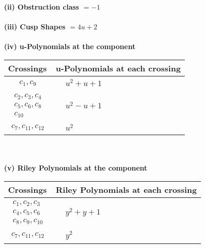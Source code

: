 \documentclass[1p]{elsarticle_modified}
\theoremstyle{definition}
\begin{document}
\flushleft \textbf{(ii) Obstruction class $= -1$}\\~\\
\flushleft \textbf{(iii) Cusp Shapes $= 4 u+2$}\\~\\
\newpage\renewcommand{\arraystretch}{1}
\flushleft \textbf{(iv) u-Polynomials at the component}\newline \\
\begin{tabular}{m{50pt}|m{274pt}}
Crossings & \hspace{64pt}u-Polynomials at each crossing \\
\hline $$\begin{aligned}c_{1},c_{9}\end{aligned}$$&$\begin{aligned}
&u^2+u+1
\end{aligned}$\\
\hline $$\begin{aligned}c_{2},c_{3},c_{4}\\c_{5},c_{6},c_{8}\\c_{10}\end{aligned}$$&$\begin{aligned}
&u^2- u+1
\end{aligned}$\\
\hline $$\begin{aligned}c_{7},c_{11},c_{12}\end{aligned}$$&$\begin{aligned}
&u^2
\end{aligned}$\\
\hline
\end{tabular}\\~\\
\newpage\renewcommand{\arraystretch}{1}
\flushleft \textbf{(v) Riley Polynomials at the component}\newline \\
\begin{tabular}{m{50pt}|m{274pt}}
Crossings & \hspace{64pt}Riley Polynomials at each crossing \\
\hline $$\begin{aligned}c_{1},c_{2},c_{3}\\c_{4},c_{5},c_{6}\\c_{8},c_{9},c_{10}\end{aligned}$$&$\begin{aligned}
&y^2+y+1
\end{aligned}$\\
\hline $$\begin{aligned}c_{7},c_{11},c_{12}\end{aligned}$$&$\begin{aligned}
&y^2
\end{aligned}$\\
\hline
\end{tabular}\\~\\
\end{document}
